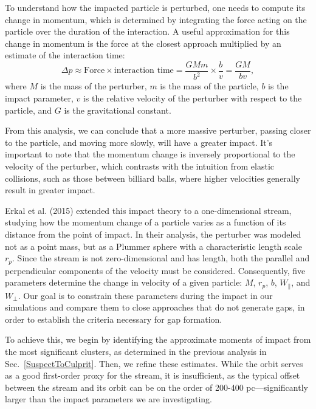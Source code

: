 \documentclass[draft]{aa}
\begin{document}
    To understand how the impacted particle is perturbed, one needs to compute its change in momentum, which is determined by integrating the force acting on the particle over the duration of the interaction. A useful approximation for this change in momentum is the force at the closest approach multiplied by an estimate of the interaction time:
    \begin{equation} 
      \Delta p \approx \text{Force} \times \text{interaction time} = \frac{GMm}{b^2} \times \frac{b}{v} = \frac{GM}{bv}, 
      \end{equation}
    where $M$ is the mass of the perturber, $m$ is the mass of the particle, $b$ is the impact parameter, $v$ is the relative velocity of the perturber with respect to the particle, and $G$ is the gravitational constant.

    From this analysis, we can conclude that a more massive perturber, passing closer to the particle, and moving more slowly, will have a greater impact. It's important to note that the momentum change is inversely proportional to the velocity of the perturber, which contrasts with the intuition from elastic collisions, such as those between billiard balls, where higher velocities generally result in greater impact.

    Erkal et al. (2015) extended this impact theory to a one-dimensional stream, studying how the momentum change of a particle varies as a function of its distance from the point of impact. In their analysis, the perturber was modeled not as a point mass, but as a Plummer sphere with a characteristic length scale $r_p$. Since the stream is not zero-dimensional and has length, both the parallel and perpendicular components of the velocity must be considered. Consequently, five parameters determine the change in velocity of a given particle: $M$, $r_p$, $b$, $W_\parallel$, and $W_\perp$. Our goal is to constrain these parameters during the impact in our simulations and compare them to close approaches that do not generate gaps, in order to establish the criteria necessary for gap formation.

    To achieve this, we begin by identifying the approximate moments of impact from the most significant clusters, as determined in the previous analysis in Sec.~\ref{SuspectToCulprit}. Then, we refine these estimates. While the orbit serves as a good first-order proxy for the stream, it is insufficient, as the typical offset between the stream and its orbit can be on the order of 200-400 pc—significantly larger than the impact parameters we are investigating.
\end{document}
